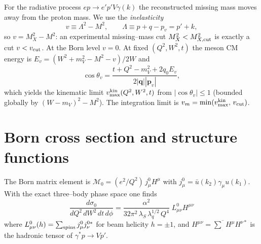 \documentclass[11pt]{article}
\begin{document}
For the radiative process $ep\to e'p'V\gamma(k)$ the reconstructed missing
mass moves away from the proton mass. We use the \emph{inelasticity}
\begin{equation}
v \equiv \Lambda^2-M^2,\qquad \Lambda\equiv p+q-p_v = p'+k ,
\label{eq:v}
\end{equation}
so $v=M_X^2-M^2$: an experimental missing--mass cut $M_X^2<M^2_{X,\rm cut}$
is exactly a cut $v<v_{\rm cut}$. At the Born level $v=0$. At fixed
$(Q^2,W^2,t)$ the meson CM energy is
$E_v=(W^2+m_V^2-M^2-v)/2W$ and
\begin{equation}
\cos\theta_v=\frac{t+Q^2-m_V^2+2q_0E_v}{2|\bm q||\bm p_v|},
\end{equation}
which yields the kinematic limit $v^{\rm kin}_{\max}(Q^2,W^2,t)$ from
$|\cos\theta_v|\le1$ (bounded globally by $(W-m_V)^2-M^2$). The integration
limit is $v_m=\min(v^{\rm kin}_{\max},\,v_{\rm cut})$.

\section{Born cross section and structure functions}

The Born matrix element is $\mathcal M_0=(e^2/Q^2)\,j^0_\mu H^\mu$ with
$j^0_\mu=\bar u(k_2)\gamma_\mu u(k_1)$. With the exact three--body phase
space one finds
\begin{equation}
\boxed{\
\frac{d\sigma_0}{dQ^2\,dW^2\,dt\,d\phi}
=\frac{\alpha^2}{32\pi^2\,\lambda_S\,\lambda_q^{1/2}\,Q^4}\;
L^0_{\mu\nu}H^{\mu\nu} \ }
\label{eq:born}
\end{equation}
where $L^0_{\mu\nu}(h)=\sum_{\rm spins}j^0_\mu j^{0*}_\nu$ for beam helicity
$h=\pm1$, and $H^{\mu\nu}=\overline{\sum}H^\mu H^{\nu*}$ is the hadronic
tensor of $\gamma^*p\to Vp'$.
\end{document}
